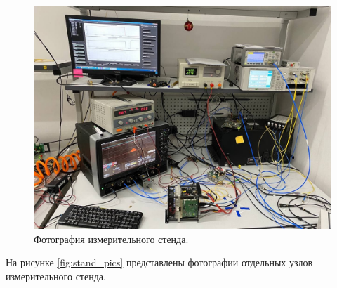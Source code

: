 \documentclass[12pt]{article}
\begin{document}
\begin{figure}[h]\centering
	\includegraphics[width=1\textwidth]{full_stand}
   \caption{Фотография измерительного стенда.}
   \label{fig:full_stand}
\end{figure}

На рисунке \ref{fig:stand_pics} представлены фотографии отдельных узлов измерительного стенда. 
\end{document}

